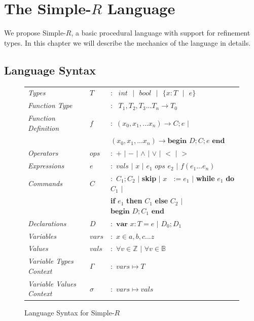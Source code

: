 \documentclass[a4paper,12pt]{report}
\begin{document}
\chapter{The Simple-$R$ Language} \label{chapter:simple_r}
We propose Simple-$R$, a basic procedural language with support for refinement 
types. In this chapter we will describe the mechanics of the language in details.

\section{Language Syntax}
\begin{figure}[h]
  \begin{center}
    \begin{tabular}{l l l}
      \textit{Types} & $T$ & $:\text{ }int\text{ }|\text{ }bool\text{ }|
      \text{ }\{x: T\text{ }|\text{ }e\}$\\
      \textit{Function Type} &  & $:\text{ }T_1, T_2,T_3...T_n\longrightarrow T_0$\\
      \textit{Function Definition} & $f$ & $:$ $(x_0,x_1,...x_n) \longrightarrow C;e$ $|$ \\ 
      & & \; $(x_0,x_1,...x_n) \longrightarrow \textbf{begin } D;C;e\textbf{ end}$\\
      \textit{Operators} & $ops$ & $:$ $+$ $|$ $-$ $|$ $\wedge$ $|$ $\vee$ $|$ $<$ $|$ $>$ \\
      \textit{Expressions} & $e$ & $:$ $vals$ $|$ $x$ $|$ $e_1$ $ops$ $e_2$ 
      $|$ $f(e_1...e_n)$ \\
      \textit{Commands} & $C$ & $:$ $C_1;C_2$ $|$ \textbf{skip} $|$ $x\text{ }:= e_1$ 
      $|$ \textbf{while} $e_1$ \textbf{do} $C_1$ $|$ \\ 
        & & \; \textbf{if} $e_1$ \textbf{then} $C_1$ \textbf{else} $C_2$ $|$ 
        $\textbf{begin } D;C_1\textbf{ end}$ \\
      \textit{Declarations} & $D$ & $:$ $\textbf{var } x : T = e$ $|$ $D_0;D_1$\\
      \textit{Variables} & $vars$& $:$ $x \in {a,b,c...z}$\\
      \textit{Values} & $vals$& $:$ $\forall v \in \mathbb{Z}$ $|$ $\forall v \in \mathbb{B}$\\
      \textit{Variable Types Context} & $\Gamma$& $:$ $vars \mapsto T$\\
      \textit{Variable Values Context} & $\sigma$& $:$ $vars \mapsto vals$
    \end{tabular}
  \end{center}
  \caption{Language Syntax for Simple-$R$}
  \label{fig:simple_r_syntax}
\end{figure}
\end{document}
